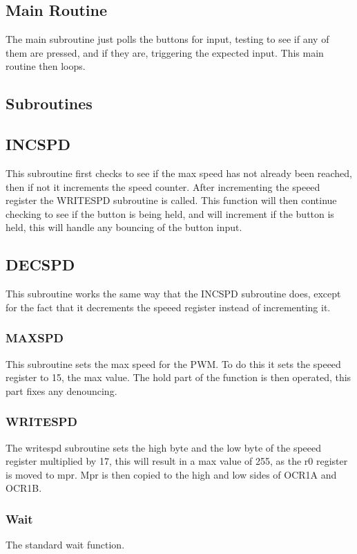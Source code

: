 \documentclass[12pt,letterpaper]{article}
\begin{document}
\subsection{Main Routine}
The main subroutine just polls the buttons for input, testing to see if any of them are pressed, and if they are, triggering the expected input. This main routine then loops. 


\subsection{Subroutines}
	\subsection{INCSPD}
	This subroutine first checks to see if the max speed has not already been reached, then if not it increments the speed counter. After incrementing the speeed register the WRITESPD subroutine is called. This function will then continue checking to see if the button is being held, and will increment if the button is held, this will handle any bouncing of the button input.
	\subsection{DECSPD}
	This subroutine works the same way that the INCSPD subroutine does, except for the fact that it decrements the speeed register instead of incrementing it.

	\subsubsection{MAXSPD}
	This subroutine sets the max speed for the PWM. To do this it sets the speeed register to 15, the max value. 
	The hold part of the function is then operated, this part fixes any denouncing. 
	 
	
	\subsubsection{WRITESPD}
	The writespd subroutine sets the high byte and the low byte of the speeed register multiplied by 17, this will result in a max value of 255, as the r0 register is moved to mpr. Mpr is then copied to the high and low sides of OCR1A and OCR1B. 
	
	\subsubsection{Wait}
	The standard wait function.
	
\end{document}

